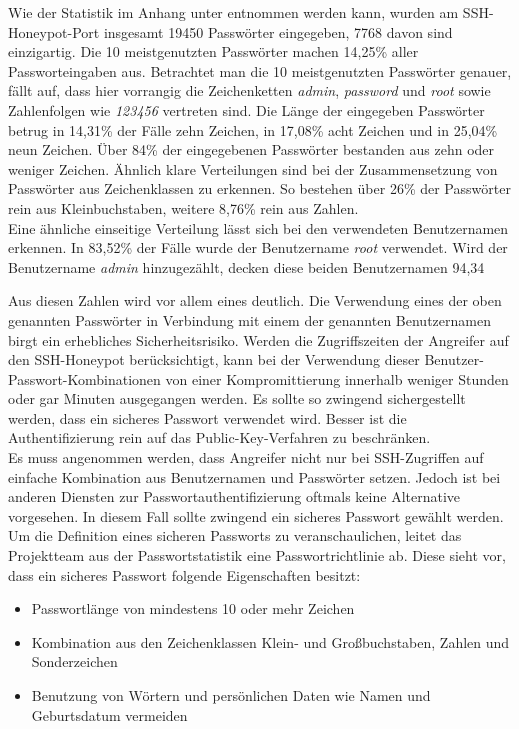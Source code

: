 Wie der Statistik im Anhang unter  entnommen werden kann, wurden am SSH-Honeypot-Port insgesamt 19450 Passwörter eingegeben, 7768 davon sind einzigartig. Die 10 meistgenutzten Passwörter machen 14,25\% aller Passworteingaben aus. Betrachtet man die 10 meistgenutzten Passwörter genauer, fällt auf, dass hier vorrangig die Zeichenketten \textit{admin}, \textit{password} und \textit{root} sowie Zahlenfolgen wie \textit{123456} vertreten sind. Die Länge der eingegeben Passwörter betrug in 14,31\% der Fälle zehn Zeichen, in 17,08\% acht Zeichen und in 25,04\% neun Zeichen. Über 84\% der eingegebenen Passwörter bestanden aus zehn oder weniger Zeichen. Ähnlich klare Verteilungen sind bei der Zusammensetzung von Passwörter aus Zeichenklassen zu erkennen. So bestehen über 26\% der Passwörter rein aus Kleinbuchstaben, weitere 8,76\% rein aus Zahlen.\\

Eine ähnliche einseitige Verteilung lässt sich bei den verwendeten Benutzernamen erkennen. In 83,52\% der Fälle wurde der Benutzername \textit{root} verwendet. Wird der Benutzername \textit{admin} hinzugezählt, decken diese beiden Benutzernamen 94,34%

Aus diesen Zahlen wird vor allem eines deutlich. Die Verwendung eines der oben genannten Passwörter in Verbindung mit einem der genannten Benutzernamen birgt ein erhebliches Sicherheitsrisiko. Werden die Zugriffszeiten der Angreifer auf den SSH-Honeypot berücksichtigt, kann bei der Verwendung dieser Benutzer-Passwort-Kombinationen von einer Kompromittierung innerhalb weniger Stunden oder gar Minuten ausgegangen werden. Es sollte so zwingend sichergestellt werden, dass ein sicheres Passwort verwendet wird. Besser ist die Authentifizierung rein auf das Public-Key-Verfahren zu beschränken.\\

Es muss angenommen werden, dass Angreifer nicht nur bei SSH-Zugriffen auf einfache Kombination aus Benutzernamen und Passwörter setzen. Jedoch ist bei anderen Diensten zur Passwortauthentifizierung oftmals keine Alternative vorgesehen. In diesem Fall sollte zwingend ein sicheres Passwort gewählt werden. Um die Definition eines sicheren Passworts zu veranschaulichen, leitet das Projektteam aus der Passwortstatistik eine Passwortrichtlinie ab. Diese sieht vor, dass ein sicheres Passwort folgende Eigenschaften besitzt:

\begin{itemize}
\item Passwortlänge von mindestens 10 oder mehr Zeichen
\item Kombination aus den Zeichenklassen Klein- und Großbuchstaben, Zahlen und Sonderzeichen
\item Benutzung von Wörtern und persönlichen Daten wie Namen und Geburtsdatum vermeiden
\end{itemize}

